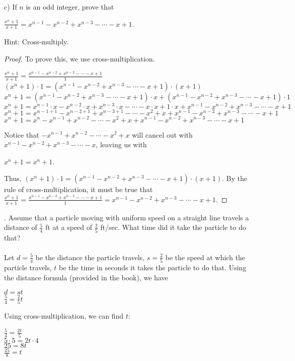 \documentclass[12pt]{article}
\begin{document}
\noindent c) If $n$ is an odd integer, prove that
\begin{center}
$\displaystyle \frac{x^n+1}{x+1}=x^{n-1}-x^{n-2}+x^{n-3}-\cdots-x+1$.
\end{center}
Hint: Cross-multiply.
\begin{proof}
To prove this, we use cross-multiplication.
\begin{center}
$\displaystyle \frac{x^n+1}{x+1}=\displaystyle \frac{x^{n-1}-x^{n-2}+x^{n-3}-\cdots-x+1}{1}$ \\
$(x^n+1)\cdot1=(x^{n-1}-x^{n-2}+x^{n-3}-\cdots-x+1)\cdot(x+1)$ \\
$x^n+1=(x^{n-1}-x^{n-2}+x^{n-3}-\cdots-x+1)\cdot x+(x^{n-1}-x^{n-2}+x^{n-3}-\cdots-x+1)\cdot1$ \\
$x^n+1=x^{n-1}\cdot x-x^{n-2}\cdot x+x^{n-3}\cdot x-\cdots-x\cdot x+1\cdot x+x^{n-1}-x^{n-2}+x^{n-3}-\cdots-x+1$ \\
$x^n+1=x^{n-1+1}-x^{n-2+1}+x^{n-3+1}-\cdots-x^2+x+x^{n-1}-x^{n-2}+x^{n-3}-\cdots-x+1$ \\
$x^n+1=x^n-x^{n-1}+x^{n-2}-\cdots-x^2+x+x^{n-1}-x^{n-2}+x^{n-3}-\cdots-x+1$
\end{center}
Notice that $-x^{n-1}+x^{n-2}-\cdots-x^2+x$ will cancel out with $x^{n-1}-x^{n-2}+x^{n-3}-\cdots-x$, leaving us with
\begin{center}
$x^n+1=x^n+1$.
\end{center}
Thus, $(x^n+1)\cdot1=(x^{n-1}-x^{n-2}+x^{n-3}-\cdots-x+1)\cdot(x+1)$. By the rule of cross-multiplication, it must be true that $\displaystyle \frac{x^n+1}{x+1}=\displaystyle \frac{x^{n-1}-x^{n-2}+x^{n-3}-\cdots-x+1}{1}=x^{n-1}-x^{n-2}+x^{n-3}-\cdots-x+1$.
\end{proof}
. Assume that a particle moving with uniform speed on a straight line travels a distance of $\frac{5}{4}$ ft at a speed of $\frac{2}{5}$ ft/sec. What time did it take the particle to do that? \\
\\
Let $d=\frac{5}{4}$ be the distance the particle travels, $s=\frac{2}{5}$ be the speed at which the particle travels, $t$ be the time in seconds it takes the particle to do that. Using the distance formula (provided in the book), we have
\begin{center}
$d=st$ \\
$\frac{5}{4}=\frac{2}{5}t$
\end{center}
Using cross-multiplication, we can find $t$:
\begin{center}
$\displaystyle \frac{5}{4}=\displaystyle \frac{2t}{5}$ \\
$5\cdot5=2t\cdot4$ \\
$25=8t$ \\
$\displaystyle \frac{25}{8}=t$
\end{center}
\end{document}
